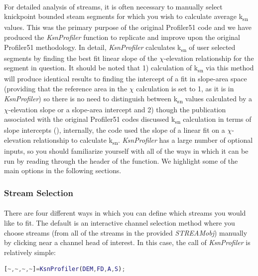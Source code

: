 \paragraph{}For detailed analysis of streams, it is often necessary to manually select knickpoint bounded steam segments for which you wish to calculate average k\textsubscript{sn} values. This was the primary purpose of the original Profiler51 code and we have produced the \textit{KsnProfiler} function to replicate and improve upon the original Profiler51 methodology. In detail, \textit{KsnProfiler} calculates k\textsubscript{sn} of user selected segments by finding the best fit linear slope of the $\chi$-elevation relationship for the segment in question. It should be noted that 1) calculation of k\textsubscript{sn} via this method will produce identical results to finding the intercept of a fit in slope-area space (providing that the reference area in the $\chi$ calculation is set to 1, as it is in \textit{KsnProfiler}) so there is no need to distinguish between k\textsubscript{sn} values calculated by a $\chi$-elevation slope or a slope-area intercept and 2) though the publication associated with the original Profiler51 codes discussed k\textsubscript{sn} calculation in terms of slope intercepts (\cite{Wobus2006}), internally, the code used the slope of a linear fit on a $\chi$-elevation relationship to calculate k\textsubscript{sn}. \textit{KsnProfiler} has a large number of optional inputs, so you should familiarize yourself with all of the ways in which it can be run by reading through the header of the function. We highlight some of the main options in the following sections.

\subsubsection{Stream Selection}
\paragraph{}There are four different ways in which you can define which streams you would like to fit. The default is an interactive channel selection method where you choose streams (from all of the streams in the provided \textit{STREAMobj}) manually by clicking near a channel head of interest. In this case, the call of \textit{KsnProfiler} is relatively simple:

\begin{lstlisting}[language=Matlab]
[~,~,~,~]=KsnProfiler(DEM,FD,A,S);
\end{lstlisting}

